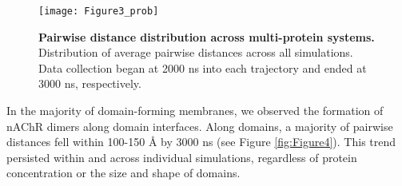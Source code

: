 \begin{figure}[h]
\centering
\texttt{[image: Figure3\_prob]}
\caption[Pairwise distance distribution across multi-protein systems.] {{\bf Pairwise distance distribution across multi-protein systems.} Distribution of average pairwise distances across all simulations. Data collection began at 2000 ns into each trajectory and ended at 3000 ns, respectively. }
\label{fig:Figure6}
\end{figure}




In the majority of domain-forming membranes, we observed the formation of nAChR dimers along domain interfaces. Along domains, a majority of pairwise distances  fell within 100-150 {\AA} by 3000 ns (see Figure \ref{fig:Figure4}). This trend persisted within and across individual simulations, regardless of protein concentration or the size and shape of domains.
























